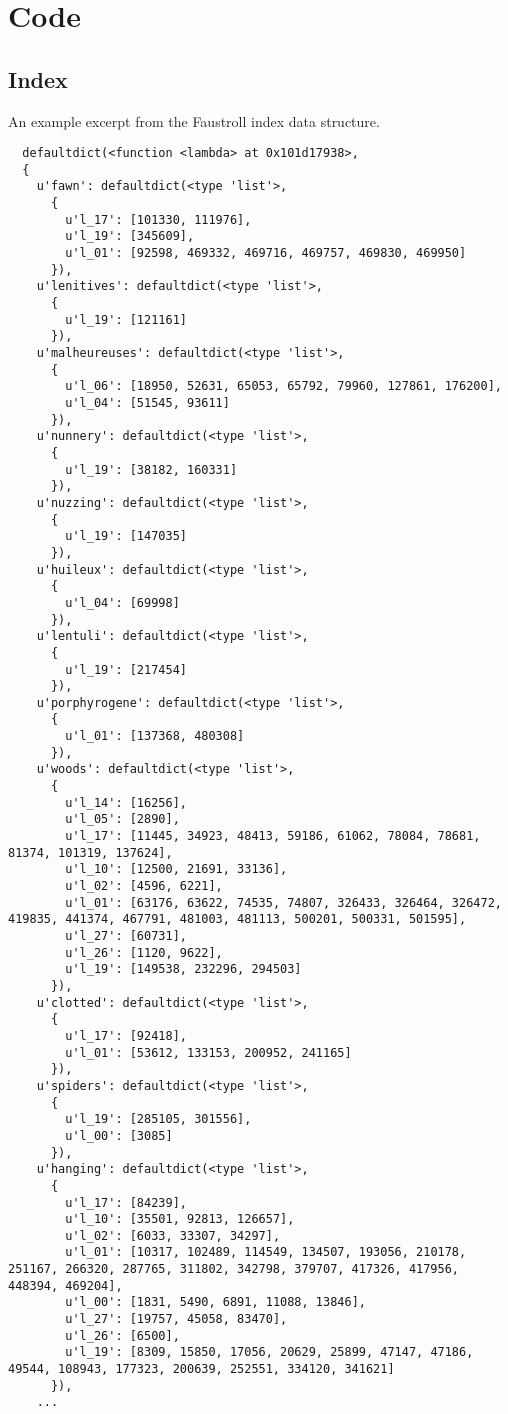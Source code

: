 
\chapter{Code}
\label{app:code}

\vspace{5cm}


\section{Index}
\label{s:appindex}

An example excerpt from the Faustroll index data structure.

\begin{verbatim}
  defaultdict(<function <lambda> at 0x101d17938>, 
  {
    u'fawn': defaultdict(<type 'list'>, 
      {
        u'l_17': [101330, 111976], 
        u'l_19': [345609], 
        u'l_01': [92598, 469332, 469716, 469757, 469830, 469950]
      }), 
    u'lenitives': defaultdict(<type 'list'>, 
      {
        u'l_19': [121161]
      }), 
    u'malheureuses': defaultdict(<type 'list'>, 
      {
        u'l_06': [18950, 52631, 65053, 65792, 79960, 127861, 176200], 
        u'l_04': [51545, 93611]
      }), 
    u'nunnery': defaultdict(<type 'list'>, 
      {
        u'l_19': [38182, 160331]
      }), 
    u'nuzzing': defaultdict(<type 'list'>, 
      {
        u'l_19': [147035]
      }), 
    u'huileux': defaultdict(<type 'list'>, 
      {
        u'l_04': [69998]
      }), 
    u'lentuli': defaultdict(<type 'list'>, 
      {
        u'l_19': [217454]
      }), 
    u'porphyrogene': defaultdict(<type 'list'>, 
      {
        u'l_01': [137368, 480308]
      }), 
    u'woods': defaultdict(<type 'list'>, 
      {
        u'l_14': [16256], 
        u'l_05': [2890], 
        u'l_17': [11445, 34923, 48413, 59186, 61062, 78084, 78681, 81374, 101319, 137624], 
        u'l_10': [12500, 21691, 33136], 
        u'l_02': [4596, 6221], 
        u'l_01': [63176, 63622, 74535, 74807, 326433, 326464, 326472, 419835, 441374, 467791, 481003, 481113, 500201, 500331, 501595], 
        u'l_27': [60731], 
        u'l_26': [1120, 9622], 
        u'l_19': [149538, 232296, 294503]
      }), 
    u'clotted': defaultdict(<type 'list'>, 
      {
        u'l_17': [92418], 
        u'l_01': [53612, 133153, 200952, 241165]
      }), 
    u'spiders': defaultdict(<type 'list'>, 
      {
        u'l_19': [285105, 301556], 
        u'l_00': [3085]
      }), 
    u'hanging': defaultdict(<type 'list'>, 
      {
        u'l_17': [84239], 
        u'l_10': [35501, 92813, 126657], 
        u'l_02': [6033, 33307, 34297], 
        u'l_01': [10317, 102489, 114549, 134507, 193056, 210178, 251167, 266320, 287765, 311802, 342798, 379707, 417326, 417956, 448394, 469204], 
        u'l_00': [1831, 5490, 6891, 11088, 13846], 
        u'l_27': [19757, 45058, 83470], 
        u'l_26': [6500], 
        u'l_19': [8309, 15850, 17056, 20629, 25899, 47147, 47186, 49544, 108943, 177323, 200639, 252551, 334120, 341621]
      }),
    ...
\end{verbatim}


